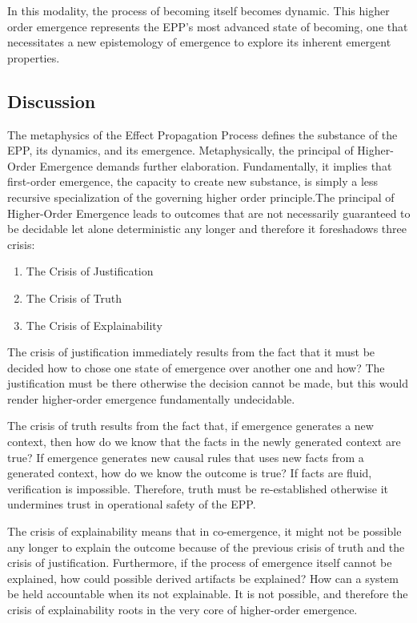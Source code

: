 In this modality, the process of becoming itself becomes dynamic. This higher order emergence represents the EPP's most advanced state of becoming, one that necessitates a new epistemology of emergence to explore its inherent emergent properties.

\subsection{Discussion}
\label{sec:metaphysics_discussion}

The metaphysics of the Effect Propagation Process defines the substance of the EPP, its dynamics, 
and its emergence.  Metaphysically, the principal of Higher-Order Emergence demands further elaboration. 
Fundamentally, it implies that first-order emergence, the capacity to create new substance, is simply a less recursive specialization of the governing higher order principle.The principal of Higher-Order Emergence leads to outcomes that are not necessarily guaranteed to be decidable let alone deterministic any longer
and therefore it foreshadows three crisis:

\begin{enumerate}
	\item The Crisis of Justification
	\item The Crisis of Truth
	\item The Crisis of Explainability
\end{enumerate}


The crisis of justification immediately results from the fact that it must be decided how to chose one state of emergence over another one and how? The justification must be there otherwise the decision cannot be made, but this would render higher-order emergence fundamentally undecidable. 

The crisis of truth results from the fact that, if emergence generates a new context, then how do we know that
the facts in the newly generated context are true? If emergence generates new causal rules that uses new facts from a generated context, how do we know the outcome is true? If facts are fluid, verification is impossible. Therefore, truth must be re-established otherwise it undermines trust in operational safety of the EPP. 

The crisis of explainability means that in co-emergence, it might not be possible any longer to explain the outcome because of the previous crisis of truth and the crisis of justification. Furthermore, if the process of emergence itself cannot be explained, how could possible derived artifacts be explained? How can a system be held accountable when its not explainable. It is not possible, and therefore the crisis of explainability roots in the very core of higher-order emergence.

